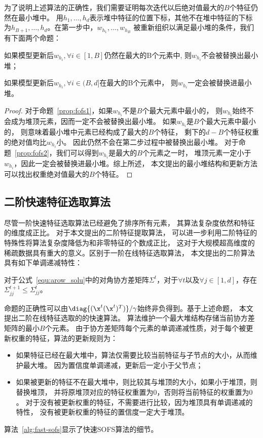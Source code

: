 为了说明上述算法的正确性，我们需要证明每次迭代以后绝对值最大的$B$个特征仍然在最小堆中。
用$h_1,\ldots, h_d$表示堆中特征的位置下标，其他不在堆中特征的下标为$h_{B+1},
\ldots, h_d$。在第一步中，$w_{h_1},\ldots, w_{h_B}$
被重新组织以满足最小堆的条件，我们有下面两个命题：
\begin{proposition}\label{prop:fofs1}
    如果模型更新后$w_{h_i}, \forall i \in [1,B]$仍然在最大的B个元素中,
    则$w_{h_i}$不会被替换出最小堆；
\end{proposition}
\begin{proposition}\label{prop:fofs2}
    如果模型更新后$w_{h_i}, \forall i \in (B,d]$在最大的B个元素中，
    则$w_{h_i}$一定会被替换进最小堆。
\end{proposition}
\begin{proof}
    对于命题~\ref{prop:fofs1}，如果$w_{h_i}$不是$B$个最大元素中最小的，
    则$w_{h_i}$始终不会成为堆顶元素，因而一定不会被替换出最小堆。
    如果$w_{h_i}$是$B$个最大元素中最小的，
    则意味着最小堆中元素已经构成了最大的$B$个特征，
    剩下的$d-B$个特征权重的绝对值均比$w_{h_i}$小。
    因此仍然不会在第二步过程中被替换出最小堆。
    对于命题~\ref{prop:fofs2}，我们可以得到$w_{h_i}$是最大的$B$个元素之一时，
    堆顶元素一定小于$w_{h_i}$，因此一定会被替换进最小堆。综上所述，
    本文提出的最小堆结构和更新方法可以找出权重绝对值最大的$B$个特征。
\end{proof}

\subsection{二阶快速特征选取算法}
尽管一阶快速特征选取算法已经避免了排序所有元素，
其算法复杂度依然和特征的维度成正比。
对于本文提出的二阶特征提取算法，
可以进一步利用二阶特征的特殊性将算法复杂度降低为和非零特征的个数成正比，
这对于大规模超高维度的稀疏数据具有重大的意义。区别于一阶在线特征选取算法，
本文提出的二阶算法具有如下单调递减特性：

\begin{proposition}[单调递减性]\label{prop:sofs}
    对于公式~\eqref{equ:arow_solu}中的对角协方差矩阵$\Sigma^t$，对于$\forall t$以及$\forall
    j\in[1,d]$，存在$\Sigma_{jj}^{t+1} \leq \Sigma_{jj}^t$。
\end{proposition}

命题的正确性可以由$\diag{(\x^t(\x^t)^T)}/\gamma$始终非负得到。基于上述命题，
本文提出二阶在线特征选取的的快速算法。
算法维护一个最大堆结构存储当前协方差矩阵的最小$B$个元素。
由于协方差矩阵每个元素的单调递减性质，对于每个被更新权重的特征，算法的更新规则为：
\begin{itemize}
    \item 如果特征已经在最大堆中，算法仅需要比较当前特征与子节点的大小，从而维护最大堆。
        因为置信度单调递减，更新后一定小于父节点；
    \item 如果被更新的特征不在最大堆中，则比较其与堆顶的大小，如果小于堆顶，则替换堆顶，
        并将原堆顶对应的特征权重置为$0$，否则将当前特征的权重置为$0$。
        对于没有被更新权重的特征，不需要进行比较，因为堆顶具有单调递减的特性，
        没有被更新权重的特征的置信度一定大于堆顶。
\end{itemize}
算法~\ref{alg:fast-sofs}显示了快速SOFS算法的细节。

